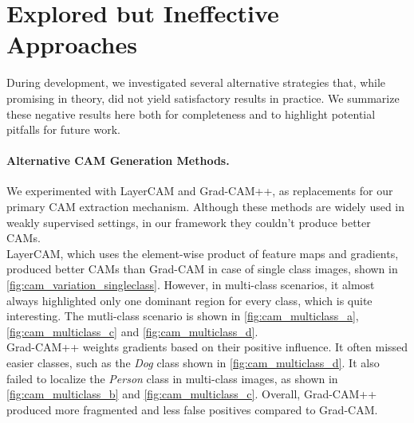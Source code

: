 
\section{Explored but Ineffective Approaches}
\label{sec:ineffective_approaches}

During development, we investigated several alternative strategies that, while promising in theory, did not yield satisfactory results in practice. We summarize these negative results here both for completeness and to highlight potential pitfalls for future work.  

\paragraph{Alternative CAM Generation Methods.} 
We experimented with LayerCAM and Grad-CAM++, as replacements for our primary CAM extraction mechanism. Although these methods are widely used in weakly supervised settings, in our framework they couldn't produce better CAMs. \\
LayerCAM, which uses the element-wise product of feature maps and gradients, produced better CAMs than Grad-CAM in case of single class images, shown in \autoref{fig:cam_variation_singleclass}. However, in multi-class scenarios, it almost always highlighted only one dominant region for every class, which is quite interesting. The mutli-class scenario is shown in \autoref{fig:cam_multiclass_a}, \autoref{fig:cam_multiclass_c} and \autoref{fig:cam_multiclass_d}. \\
Grad-CAM++ weights gradients based on their positive influence. It often missed easier classes, such as the \textit{Dog} class shown in \autoref{fig:cam_multiclass_d}. It also failed to localize the \textit{Person} class in multi-class images, as shown in \autoref{fig:cam_multiclass_b} and \autoref{fig:cam_multiclass_c}. Overall, Grad-CAM++ produced more fragmented and less false positives compared to Grad-CAM.

